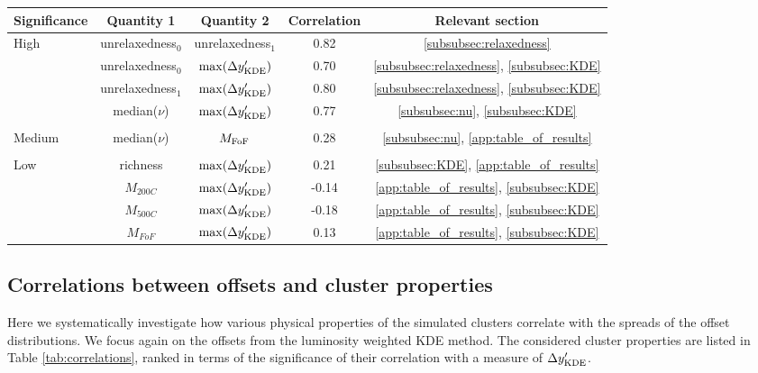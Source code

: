 \documentclass[usenatbib]{mn2e}
\begin{document}
{ 
\begin{table*}
	\centering
	\caption{Correlations between different cluster properties and the spread of the galaxy-DM offset obtained with luminosity weighted KDE method. See Section
		\ref{subsec:correlations} for details.
	\label{tab:correlations}} 
\begin{tabular}{lcccc}
\hline 
Significance & Quantity 1 &  Quantity 2 &  Correlation & Relevant section\\
\hline
High & unrelaxedness$_0$ & unrelaxedness$_1$ & 0.82 & \ref{subsubsec:relaxedness}
\\
& unrelaxedness$_0$ & $\max(\Delta y_{\rm KDE}')$ &  0.70 &
\ref{subsubsec:relaxedness}, \ref{subsubsec:KDE}
\\ 
& unrelaxedness$_1$ & $\max(\Delta y_{\rm KDE}')$ &  0.80 & \ref{subsubsec:relaxedness}, \ref{subsubsec:KDE} \\ 
& median($\nu$) &  $\max(\Delta y_{\rm KDE}')$ & 0.77 & \ref{subsubsec:nu},
\ref{subsubsec:KDE}\\
\\ \hline
Medium & median($\nu$) & $M_{\rm FoF}$ & 0.28 & \ref{subsubsec:nu},
\ref{app:table_of_results}\\
\\ \hline
Low & richness & $\max(\Delta y_{\rm KDE}')$ & 0.21 & \ref{subsubsec:KDE}, \ref{app:table_of_results}\\  
& $M_{200C}$ &  $\max(\Delta y_{\rm KDE}')$ & -0.14 &
\ref{app:table_of_results}, \ref{subsubsec:KDE}\\ 
& $M_{500C}$ & $\max(\Delta y_{\rm KDE}')$ & -0.18 &
\ref{app:table_of_results}, \ref{subsubsec:KDE}\\
& $M_{FoF}$ & $\max(\Delta y_{\rm KDE}')$ & 0.13 & \ref{app:table_of_results}, \ref{subsubsec:KDE} \\
\hline
\end{tabular} 
\end{table*}


\subsection{Correlations between offsets and cluster properties}
\label{subsec:correlations}

Here we systematically investigate how various physical properties of the simulated clusters correlate with the spreads of the offset distributions. We focus again on the offsets from the luminosity weighted KDE method. The considered cluster properties are listed in Table \ref{tab:correlations}, ranked in terms of the
significance of their correlation with a measure of $\Delta y_{\rm KDE}'$. 

}
\end{document}
